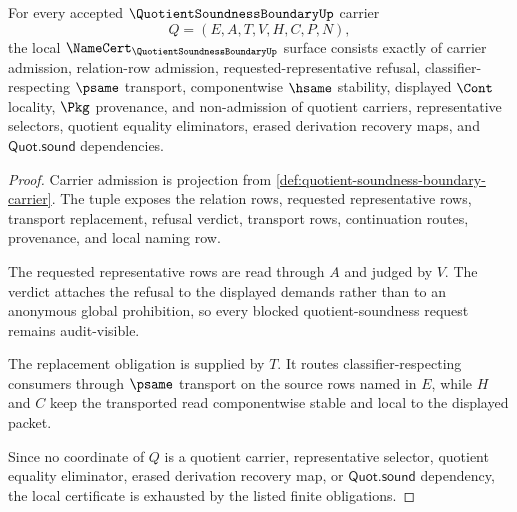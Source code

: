 \begin{theorem}
\label{thm:quotient-soundness-boundary-namecert-obligations}
For every accepted $\QuotientSoundnessBoundaryUp$ carrier
$$
Q=(E,A,T,V,H,C,P,N),
$$
the local $\NameCert_{\QuotientSoundnessBoundaryUp}$ surface consists exactly of carrier admission, relation-row admission, requested-representative refusal, classifier-respecting $\psame$ transport, componentwise $\hsame$ stability, displayed $\Cont$ locality, $\Pkg$ provenance, and non-admission of quotient carriers, representative selectors, quotient equality eliminators, erased derivation recovery maps, and $\mathsf{Quot.sound}$ dependencies.
\end{theorem}
\begin{proof}
Carrier admission is projection from \autoref{def:quotient-soundness-boundary-carrier}. The tuple exposes the relation rows, requested representative rows, transport replacement, refusal verdict, transport rows, continuation routes, provenance, and local naming row.

The requested representative rows are read through $A$ and judged by $V$. The verdict attaches the refusal to the displayed demands rather than to an anonymous global prohibition, so every blocked quotient-soundness request remains audit-visible.

The replacement obligation is supplied by $T$. It routes classifier-respecting consumers through $\psame$ transport on the source rows named in $E$, while $H$ and $C$ keep the transported read componentwise stable and local to the displayed packet.

Since no coordinate of $Q$ is a quotient carrier, representative selector, quotient equality eliminator, erased derivation recovery map, or $\mathsf{Quot.sound}$ dependency, the local certificate is exhausted by the listed finite obligations.
\end{proof}

